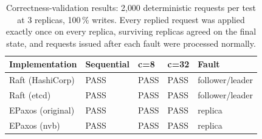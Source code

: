 \begin{table}[t]
\caption{Correctness-validation results: 2{,}000 deterministic requests per
test at 3 replicas, 100\,\% writes. Every replied request was applied exactly
once on every replica, surviving replicas agreed on the final state, and
requests issued after each fault were processed normally.}
\label{tab:correctness}
\small
\setlength{\tabcolsep}{4pt}
\begin{tabular}{@{}lllll@{}}
\toprule
Implementation & Sequential & c=8 & c=32 & Fault \\
\midrule
Raft (HashiCorp) & PASS & PASS & PASS & follower/leader \\
Raft (etcd)      & PASS & PASS & PASS & follower/leader \\
EPaxos (original) & PASS & PASS & PASS & replica \\
EPaxos (nvb)     & PASS & PASS & PASS & replica \\
\bottomrule
\end{tabular}
\end{table}